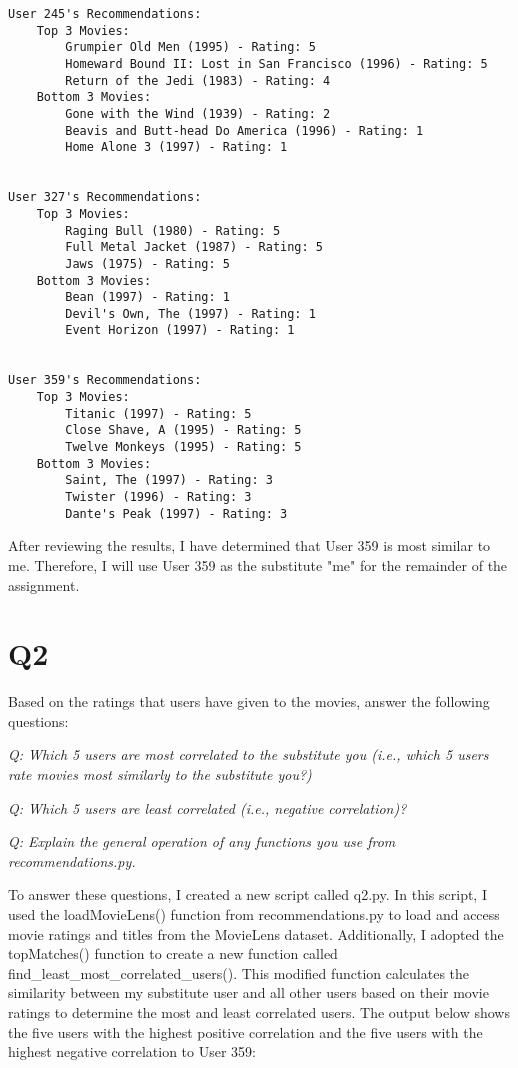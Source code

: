 \documentclass[12pt]{article}
\begin{document}
\begin{verbatim}
User 245's Recommendations:
    Top 3 Movies:
        Grumpier Old Men (1995) - Rating: 5
        Homeward Bound II: Lost in San Francisco (1996) - Rating: 5
        Return of the Jedi (1983) - Rating: 4
    Bottom 3 Movies:
        Gone with the Wind (1939) - Rating: 2
        Beavis and Butt-head Do America (1996) - Rating: 1
        Home Alone 3 (1997) - Rating: 1


User 327's Recommendations:
    Top 3 Movies:
        Raging Bull (1980) - Rating: 5
        Full Metal Jacket (1987) - Rating: 5
        Jaws (1975) - Rating: 5
    Bottom 3 Movies:
        Bean (1997) - Rating: 1
        Devil's Own, The (1997) - Rating: 1
        Event Horizon (1997) - Rating: 1


User 359's Recommendations:
    Top 3 Movies:
        Titanic (1997) - Rating: 5
        Close Shave, A (1995) - Rating: 5
        Twelve Monkeys (1995) - Rating: 5
    Bottom 3 Movies:
        Saint, The (1997) - Rating: 3
        Twister (1996) - Rating: 3
        Dante's Peak (1997) - Rating: 3
\end{verbatim}

After reviewing the results, I have determined that User 359 is most similar to me. Therefore, I will use User 359 as the substitute "me" for the remainder of the assignment.


\section*{Q2}

Based on the ratings that users have given to the movies, answer the following questions:

\emph{Q: Which 5 users are most correlated to the substitute you (i.e., which 5 users rate movies most similarly to the substitute you?)}

\emph{Q: Which 5 users are least correlated (i.e., negative correlation)?}

\emph{Q: Explain the general operation of any functions you use from recommendations.py.}

To answer these questions, I created a new script called q2.py. In this script, I used the loadMovieLens() function from recommendations.py to load and access movie ratings and titles from the MovieLens dataset. Additionally, I adopted the topMatches() function to create a new function called find\_least\_most\_correlated\_users(). This modified function calculates the similarity between my substitute user and all other users based on their movie ratings to determine the most and least correlated users. The output below shows the five users with the highest positive correlation and the five users with the highest negative correlation to User 359:
\end{document}
